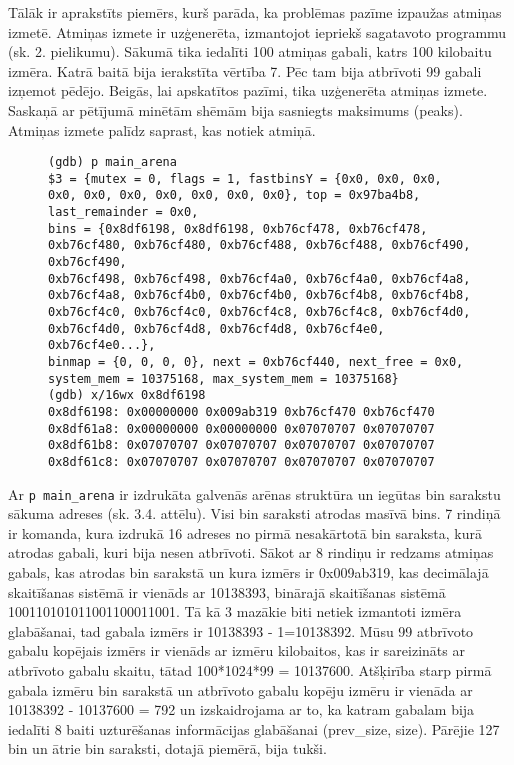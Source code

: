 Tālāk ir aprakstīts piemērs, kurš parāda, ka problēmas pazīme izpaužas atmiņas izmetē.
Atmiņas izmete ir uzģenerēta, izmantojot iepriekš sagatavoto programmu (sk. 2. pielikumu).
Sākumā tika iedalīti 100 atmiņas gabali, katrs 100 kilobaitu izmēra.
Katrā baitā bija ierakstīta vērtība 7.
Pēc tam bija atbrīvoti 99 gabali izņemot pēdējo.
Beigās, lai apskatītos pazīmi, tika uzģenerēta atmiņas izmete.
Saskaņā ar pētījumā minētām shēmām \cite{PWMS}  bija sasniegts maksimums (peaks).
Atmiņas izmete palīdz saprast, kas notiek atmiņā.
\begin{figure}[h]
\begin{lstlisting}[style=customgdb]
(gdb) p main_arena
$3 = {mutex = 0, flags = 1, fastbinsY = {0x0, 0x0, 0x0, 0x0, 0x0, 0x0, 0x0, 0x0, 0x0, 0x0}, top = 0x97ba4b8, last_remainder = 0x0,
bins = {0x8df6198, 0x8df6198, 0xb76cf478, 0xb76cf478, 0xb76cf480, 0xb76cf480, 0xb76cf488, 0xb76cf488, 0xb76cf490, 0xb76cf490,
0xb76cf498, 0xb76cf498, 0xb76cf4a0, 0xb76cf4a0, 0xb76cf4a8, 0xb76cf4a8, 0xb76cf4b0, 0xb76cf4b0, 0xb76cf4b8, 0xb76cf4b8,
0xb76cf4c0, 0xb76cf4c0, 0xb76cf4c8, 0xb76cf4c8, 0xb76cf4d0, 0xb76cf4d0, 0xb76cf4d8, 0xb76cf4d8, 0xb76cf4e0, 0xb76cf4e0...},
binmap = {0, 0, 0, 0}, next = 0xb76cf440, next_free = 0x0, system_mem = 10375168, max_system_mem = 10375168}
(gdb) x/16wx 0x8df6198
0x8df6198: 0x00000000 0x009ab319 0xb76cf470 0xb76cf470
0x8df61a8: 0x00000000 0x00000000 0x07070707 0x07070707
0x8df61b8: 0x07070707 0x07070707 0x07070707 0x07070707
0x8df61c8: 0x07070707 0x07070707 0x07070707 0x07070707
\end{lstlisting}
\caption{\textbf{\fontsize{11}{12}\selectfont {bin saraksta izdruka, izmantojot atmiņas izmeti}}}
\end{figure}
Ar \texttt{p main\_arena} ir izdrukāta galvenās arēnas struktūra un iegūtas bin sarakstu sākuma adreses (sk. 3.4. attēlu).
Visi bin saraksti atrodas masīvā bins.
7 rindiņā ir komanda, kura izdrukā 16 adreses no pirmā nesakārtotā bin saraksta, kurā atrodas gabali, kuri bija nesen atbrīvoti.
Sākot ar 8 rindiņu ir redzams atmiņas gabals, kas atrodas bin sarakstā un kura izmērs ir 0x009ab319, kas decimālajā skaitīšanas sistēmā ir vienāds ar 10138393, binārajā skaitīšanas sistēmā 100110101011001100011001.
Tā kā 3 mazākie biti netiek izmantoti izmēra glabāšanai, tad gabala izmērs ir 10138393 - 1=10138392.
Mūsu 99 atbrīvoto gabalu kopējais izmērs ir vienāds ar izmēru kilobaitos, kas ir sareizināts ar atbrīvoto gabalu skaitu, tātad 100*1024*99 = 10137600.
Atšķirība starp pirmā gabala izmēru bin sarakstā un atbrīvoto gabalu kopēju izmēru ir vienāda ar 10138392 - 10137600 = 792 un izskaidrojama ar to, ka katram gabalam bija iedalīti 8 baiti uzturēšanas informācijas glabāšanai (prev\_size, size).
Pārējie 127 bin un ātrie bin saraksti, dotajā piemērā, bija tukši.

